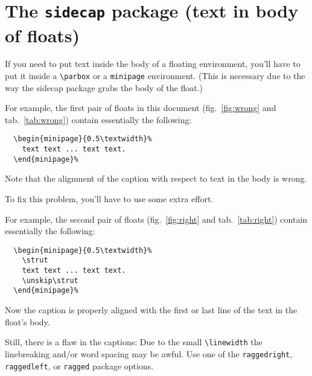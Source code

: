 \documentclass[a4paper]{article}
\begin{document}
\section*{The \texttt{sidecap} package 
  (text in body of floats)}

If you need to put text inside the body of a floating
environment, you'll have to put it inside a \verb|\parbox|
or a \verb|minipage| environment.
(This is necessary due to the way the \textsf{sidecap} package
grabs the body of the float.)

For example, the first pair of floats in this document
(fig.~\ref{fig:wrong} and tab.~\ref{tab:wrong})
contain essentially the following:
%
\begin{verbatim}
  \begin{minipage}{0.5\textwidth}%
    text text ... text text.
  \end{minipage}%	
\end{verbatim}
%
Note that the alignment of the caption with respect to text in the body
is wrong.

\begin{SCfigure}[][hb]
  \caption{`SCfigure' \CAPi}
  \label{fig:wrong}
\end{SCfigure}

\begin{SCtable}[][hb]
  \caption{`SCtable' \CAPi}
  \label{tab:wrong}
\end{SCtable}

To fix this problem, you'll have to use some extra effort.

\clearpage

For example, the second pair of floats
(fig.~\ref{fig:right} and tab.~\ref{tab:right})
contain essentially the following:
%
\begin{verbatim}
  \begin{minipage}{0.5\textwidth}%
    \strut
    text text ... text text.
    \unskip\strut
  \end{minipage}%	
\end{verbatim}
%
Now the caption is properly aligned with the first or last line of
the text in the float's body.

\begin{SCfigure}[][hb]
  \caption{`SCfigure' \CAPi}
  \label{fig:right}
\end{SCfigure}

\begin{SCtable}[][hb]
  \caption{`SCtable' \CAPi}
  \label{tab:right}
\end{SCtable}

Still, there is a flaw in the captions:
Due to the small \verb|\linewidth| the linebreaking and\slash or
word spacing may be awful.
Use one of the \texttt{raggedright}, \texttt{raggedleft}, or
\texttt{ragged} package options.
\end{document}
